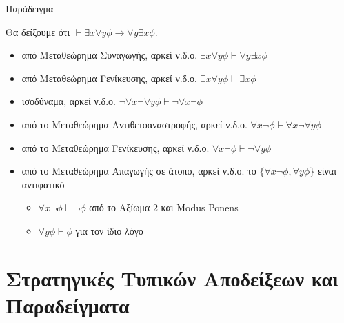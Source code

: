 \documentclass{beamer}
\begin{document}
\begin{frame}{Παράδειγμα}
  \begin{block}{}
    Θα δείξουμε ότι $\vdash \exists x \forall y \phi \rightarrow \forall y \exists x \phi$.
    \begin{itemize}
      \item[] από Μεταθεώρημα Συναγωγής, αρκεί ν.δ.ο. $\exists x \forall y \phi \vdash \forall y \exists x \phi$
      \item[] από Μεταθεώρημα Γενίκευσης, αρκεί ν.δ.ο. $\exists x \forall y \phi \vdash \exists x \phi$
      \item[] ισοδύναμα, αρκεί ν.δ.ο. $\neg\forall x \neg\forall y \phi \vdash \neg\forall x \neg\phi$
      \item[] από το Μεταθεώρημα Αντιθετοαναστροφής, αρκεί ν.δ.ο. $\forall x \neg\phi \vdash \forall x \neg\forall y \phi$
      \item[] από το Μεταθεώρημα Γενίκευσης, αρκεί ν.δ.ο. $\forall x \neg\phi \vdash \neg\forall y \phi$
      \item[] από το Μεταθεώρημα Απαγωγής σε άτοπο, αρκεί ν.δ.ο. το $\{\forall x \neg\phi, \forall y \phi\}$ είναι αντιφατικό
      \begin{itemize}
        \item $\forall x \neg\phi \vdash \neg\phi$ από το Αξίωμα 2 και Modus Ponens
        \item $\forall y \phi \vdash \phi$ για τον ίδιο λόγο
      \end{itemize}
    \end{itemize}
  \end{block}
\end{frame}

\section{Στρατηγικές Τυπικών Αποδείξεων και Παραδείγματα}
\end{document}
